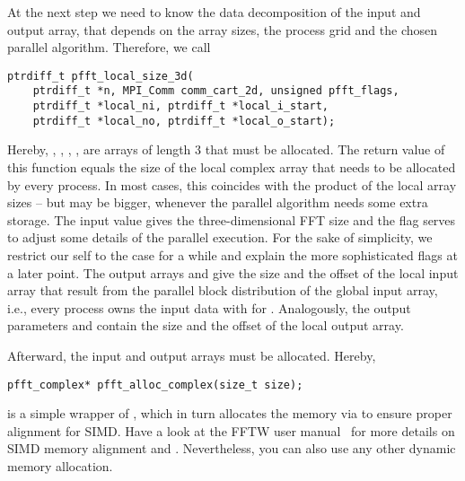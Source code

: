 At the next step we need to know the data decomposition of the input and output array, that depends on
the array sizes, the process grid and the chosen parallel algorithm. Therefore, we call
\begin{lstlisting}
ptrdiff_t pfft_local_size_3d(
    ptrdiff_t *n, MPI_Comm comm_cart_2d, unsigned pfft_flags,
    ptrdiff_t *local_ni, ptrdiff_t *local_i_start,
    ptrdiff_t *local_no, ptrdiff_t *local_o_start);
\end{lstlisting}
Hereby, , , , ,  are arrays of length $3$ that must be allocated.
The return value of this function equals the size of the local complex array that needs to be allocated by every process.
In most cases, this coincides with the product of the local array sizes -- but may be bigger,
whenever the parallel algorithm needs some extra storage.
The input value  gives the three-dimensional FFT size and the flag  serves to adjust
some details of the parallel execution. For the sake of simplicity, we restrict our self to the case
 for a while and explain the more sophisticated flags at a later point.
The output arrays  and  give the size and the offset of the local input array
that result from the parallel block distribution of the global input array, i.e.,
every process owns the input data  with 
for . Analogously, the output parameters  and  contain the size
and the offset of the local output array.

Afterward, the input and output arrays must be allocated. Hereby,
\begin{lstlisting}
pfft_complex* pfft_alloc_complex(size_t size);
\end{lstlisting}
is a simple wrapper of , which in turn allocates the memory via  to ensure proper alignment for SIMD.
Have a look at the FFTW user manual~\cite{fftw-align-mem} for more details on SIMD memory alignment and .
Nevertheless, you can also use any other dynamic memory allocation.

